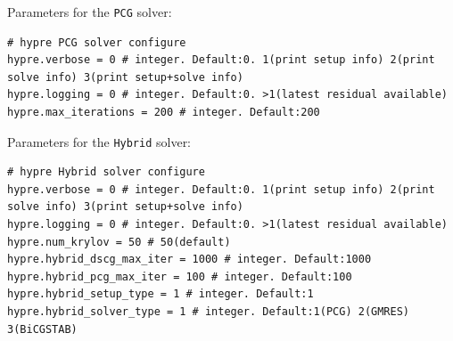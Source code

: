 \documentclass[11pt]{article}
\begin{document}
Parameters for the \verb|PCG| solver:
\begin{lstlisting}[language=pkgconfig]
# hypre PCG solver configure
hypre.verbose = 0 # integer. Default:0. 1(print setup info) 2(print solve info) 3(print setup+solve info)
hypre.logging = 0 # integer. Default:0. >1(latest residual available)
hypre.max_iterations = 200 # integer. Default:200
\end{lstlisting}

Parameters for the \verb|Hybrid| solver:
\begin{lstlisting}[language=pkgconfig]
# hypre Hybrid solver configure
hypre.verbose = 0 # integer. Default:0. 1(print setup info) 2(print solve info) 3(print setup+solve info)
hypre.logging = 0 # integer. Default:0. >1(latest residual available)
hypre.num_krylov = 50 # 50(default)
hypre.hybrid_dscg_max_iter = 1000 # integer. Default:1000
hypre.hybrid_pcg_max_iter = 100 # integer. Default:100
hypre.hybrid_setup_type = 1 # integer. Default:1
hypre.hybrid_solver_type = 1 # integer. Default:1(PCG) 2(GMRES) 3(BiCGSTAB)
\end{lstlisting}
\end{document}
